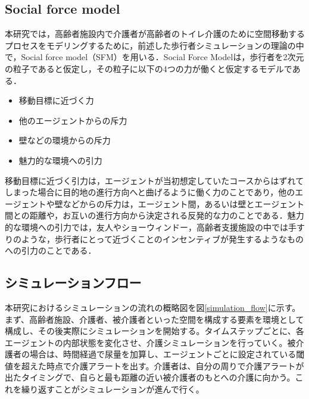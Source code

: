 \subsection{Social force model}

本研究では，高齢者施設内で介護者が高齢者のトイレ介護のために空間移動するプロセスをモデリングするために，前述した歩行者シミュレーションの理論の中で，Social force model（SFM）\cite{SFM}を用いる．Social Force Modelは，歩行者を2次元の粒子であると仮定し，その粒子に以下の4つの力が働くと仮定するモデルである．

\begin{itemize}
 \item 移動目標に近づく力
 \item 他のエージェントからの斥力
 \item 壁などの環境からの斥力
 \item 魅力的な環境への引力
\end{itemize}

移動目標に近づく引力は，エージェントが当初想定していたコースからはずれてしまった場合に目的地の進行方向へと曲げるように働く力のことであり，他のエージェントや壁などからの斥力は，エージェント間，あるいは壁とエージェント間との距離や，お互いの進行方向から決定される反発的な力のことである．魅力的な環境への引力では，友人やショーウィンドー，高齢者支援施設の中では手すりのような，歩行者にとって近づくことのインセンティブが発生するようなものへの引力のことである．

\subsection{シミュレーションフロー}

本研究におけるシミュレーションの流れの概略図を図\ref{simulation_flow}に示す。まず、高齢者施設、介護者、被介護者といった空間を構成する要素を環境として構成し、その後実際にシミュレーションを開始する。タイムステップごとに、各エージェントの内部状態を変化させ、介護シミュレーションを行っていく。被介護者の場合は、時間経過で尿量を加算し、エージェントごとに設定されている閾値を超えた時点で介護アラートを出す。介護者は、自分の周りで介護アラートが出たタイミングで、自らと最も距離の近い被介護者のもとへの介護に向かう。これを繰り返すことがシミュレーションが進んで行く。

